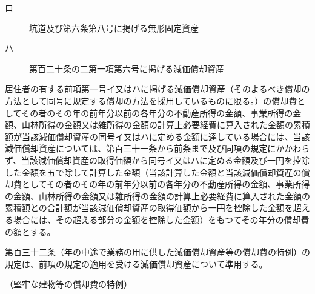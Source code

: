\documentclass[twocolumn,a4j,10pt]{ltjtarticle}
\begin{document}
\begin{description}
\begin{description}
\begin{description}
\item[ロ]坑道及び第六条第八号に掲げる無形固定資産
\item[ハ]第百二十条の二第一項第六号に掲げる減価償却資産
\end{description}
\end{description}
\item[\rensuji{2}]居住者の有する前項第一号イ又はハに掲げる減価償却資産（そのよるべき償却の方法として同号に規定する償却の方法を採用しているものに限る。）の償却費としてその者のその年の前年分以前の各年分の不動産所得の金額、事業所得の金額、山林所得の金額又は雑所得の金額の計算上必要経費に算入された金額の累積額が当該減価償却資産の同号イ又はハに定める金額に達している場合には、当該減価償却資産については、第百三十一条から前条まで及び同項の規定にかかわらず、当該減価償却資産の取得価額から同号イ又はハに定める金額及び一円を控除した金額を五で除して計算した金額（当該計算した金額と当該減価償却資産の償却費としてその者のその年の前年分以前の各年分の不動産所得の金額、事業所得の金額、山林所得の金額又は雑所得の金額の計算上必要経費に算入された金額の累積額との合計額が当該減価償却資産の取得価額から一円を控除した金額を超える場合には、その超える部分の金額を控除した金額）をもつてその年分の償却費の額とする。
\item[\rensuji{3}]第百三十二条（年の中途で業務の用に供した減価償却資産等の償却費の特例）の規定は、前項の規定の適用を受ける減価償却資産について準用する。
\end{description}
\noindent\hspace{10pt}（堅牢な建物等の償却費の特例）
\end{document}
